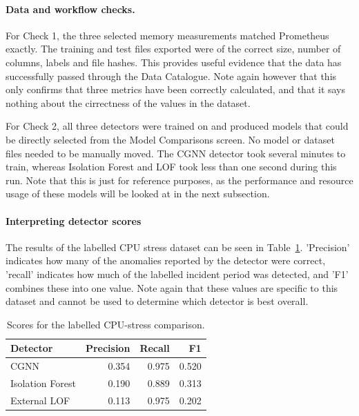 \paragraph{Data and workflow checks.}
For Check 1, the three selected memory measurements matched Prometheus exactly. The training and test files exported were of the correct size, number of columns, labels and file hashes. This provides useful evidence that the data has successfully passed through the Data Catalogue. Note again however that this only confirms that three metrics have been correctly calculated, and that it says nothing about the cirrectness of the values in the dataset.

For Check 2, all three detectors were trained on and produced models that could be directly selected from the Model Comparisons screen. No model or dataset files needed to be manually moved. The CGNN detector took several minutes to train, whereas Isolation Forest and LOF took less than one second during this run. Note that this is just for reference purposes, as the performance and resource usage of these models will be looked at in the next subsection.

\paragraph{Interpreting detector scores}
The results of the labelled CPU stress dataset can be seen in Table~\ref{tab:h9-functional-labelled-scores}. 'Precision' indicates how many of the anomalies reported by the detector were correct, 'recall' indicates how much of the labelled incident period was detected, and 'F1' combines these into one value. Note again that these values are specific to this dataset and cannot be used to determine which detector is best overall. 

\begin{table}[H]
    \centering
    \small
    \caption{Scores for the labelled CPU-stress comparison.}
    \label{tab:h9-functional-labelled-scores}
    \begin{tabular}{|l|r|r|r|}
        \hline
        Detector & Precision & Recall & F1 \\
        \hline
        CGNN & 0.354 & 0.975 & 0.520 \\
        Isolation Forest & 0.190 & 0.889 & 0.313 \\
        External LOF & 0.113 & 0.975 & 0.202 \\
        \hline
    \end{tabular}
\end{table}

